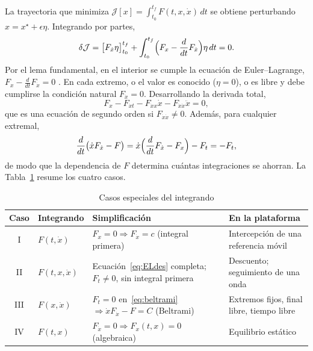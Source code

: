 \documentclass[conference]{IEEEtran}
\begin{document}
La trayectoria que minimiza $\mathcal J[x] = \int_{t_0}^{t_f}F(t, x, \dot x)\,dt$ se obtiene perturbando $x = x^\star + \epsilon\eta$. Integrando por partes,
\begin{equation}
\delta\mathcal J = \bigl[F_{\dot x}\eta\bigr]_{t_0}^{t_f} + \int_{t_0}^{t_f}\Bigl(F_x - \frac{d}{dt}F_{\dot x}\Bigr)\eta\,dt = 0 .
\label{eq:dJ}
\end{equation}
Por el lema fundamental, en el interior se cumple la ecuación de Euler--Lagrange, $F_x - \frac{d}{dt}F_{\dot x} = 0$ \cite{gelfand1963}. En cada extremo, o el valor es conocido ($\eta = 0$), o es libre y debe cumplirse la condición natural $F_{\dot x} = 0$. Desarrollando la derivada total,
\begin{equation}
F_x - F_{\dot xt} - F_{\dot xx}\dot x - F_{\dot x\dot x}\ddot x = 0 ,
\label{eq:ELdes}
\end{equation}
que es una ecuación de segundo orden si $F_{\dot x\dot x} \ne 0$. Además, para cualquier extremal,
\begin{equation}
\frac{d}{dt}\bigl(\dot xF_{\dot x} - F\bigr) = \dot x\Bigl(\frac{d}{dt}F_{\dot x} - F_x\Bigr) - F_t = -F_t ,
\label{eq:beltrami}
\end{equation}
de modo que la dependencia de $F$ determina cuántas integraciones se ahorran. La Tabla~\ref{tab:casos} resume los cuatro casos.

\begin{table}[t]
\centering
\caption{Casos especiales del integrando}
\label{tab:casos}
\footnotesize
\setlength{\tabcolsep}{3pt}
\begin{tabularx}{\columnwidth}{@{}c>{\centering\arraybackslash}p{1.25cm}>{\raggedright\arraybackslash}X>{\raggedright\arraybackslash}p{2.1cm}@{}}
\toprule
Caso & Integrando & Simplificación & En la plataforma \\
\midrule
I & $F(t, \dot x)$ & $F_x = 0 \Rightarrow F_{\dot x} = c$ (integral primera) & Intercepción de una referencia móvil \\
II & $F(t, x, \dot x)$ & Ecuación~\eqref{eq:ELdes} completa; $F_t \ne 0$, sin integral primera & Descuento; seguimiento de una onda \\
III & $F(x, \dot x)$ & $F_t = 0$ en~\eqref{eq:beltrami} $\Rightarrow \dot xF_{\dot x} - F = C$ (Beltrami) & Extremos fijos, final libre, tiempo libre \\
IV & $F(t, x)$ & $F_{\dot x} = 0 \Rightarrow F_x(t, x) = 0$ (algebraica) & Equilibrio estático \\
\bottomrule
\end{tabularx}
\end{table}
\end{document}
